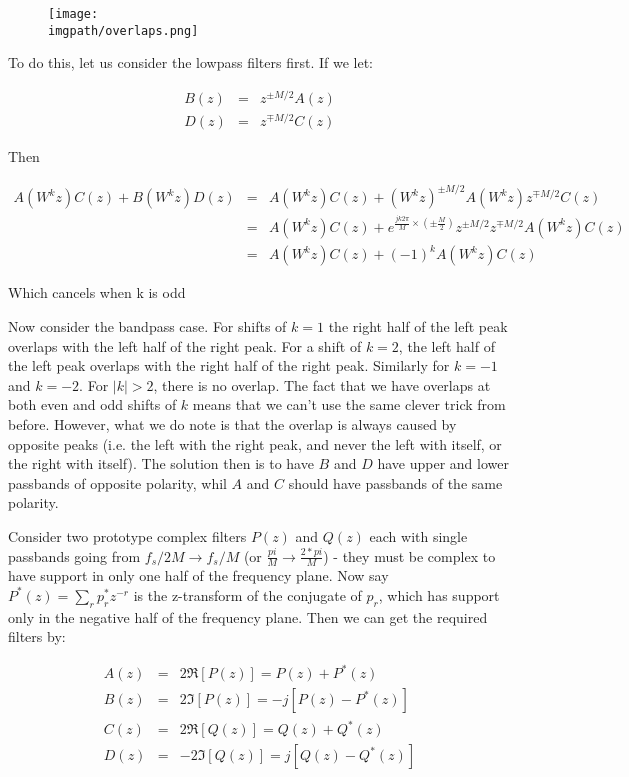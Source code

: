 \begin{figure}
  \centering
  \texttt{[image: \\imgpath/overlaps.png]}
\end{figure}

To do this, let us consider the lowpass filters first. If we let:

\begin{eqnarray}
  B(z) &=& z^{\pm M/2}A(z) \\
  D(z) &=& z^{\mp M/2}C(z)
\end{eqnarray}

Then

\begin{eqnarray}
  A(W^kz)C(z) + B(W^kz)D(z) &=& A(W^kz)C(z) + (W^kz)^{\pm M/2}A(W^kz) z^{\mp M/2}C(z) \\
  &=& A(W^kz)C(z) + e^{\frac{jk2\pi}{M} \times (\pm \frac{M}{2})} z^{\pm M/2} z^{\mp M/2} A(W^kz)C(z) \\
  &=& A(W^kz)C(z) + (-1)^k A(W^kz)C(z)
\end{eqnarray}

Which cancels when k is odd

Now consider the bandpass case. For shifts of $k=1$ the right half of the left peak overlaps with the left half of the right peak. For a shift of $k=2$, the left half of the left peak overlaps with the right half of the right peak. Similarly for $k=-1$ and $k=-2$. For $|k| > 2$, there is no overlap. The fact that we have overlaps at both even and odd shifts of $k$ means that we can't use the same clever trick from before. However, what we do note is that the overlap is always caused by opposite peaks (i.e. the left with the right peak, and never the left with itself, or the right with itself). The solution then is to have $B$ and $D$ have upper and lower passbands of opposite polarity, whil $A$ and $C$ should have passbands of the same polarity.

Consider two prototype complex filters $P(z)$ and $Q(z)$ each with single passbands going from $f_s/2M \rightarrow f_s/M$ (or $\frac{pi}{M} \rightarrow \frac{2*pi}{M}$) - they must be complex to have support in only one half of the frequency plane. Now say $P^*(z) = \sum_{r}p_r^*z^{-r}$ is the z-transform of the conjugate of $p_r$, which has support only in the negative half of the frequency plane. Then we can get the required filters by:

\begin{eqnarray}
A(z) &=& 2\Re [P(z)] = P(z) + P^*(z) \\
B(z) &=& 2\Im [P(z)] = -j[P(z) - P^*(z)] \\
C(z) &=& 2\Re [Q(z)] = Q(z) + Q^*(z) \\
D(z) &=& -2\Im [Q(z)] = j[Q(z) - Q^*(z)]
\end{eqnarray}

